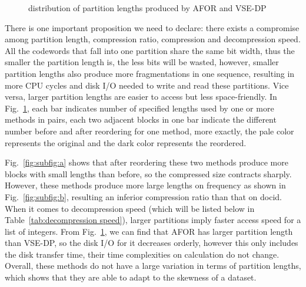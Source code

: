 \documentclass[runningheads,a4paper]{llncs}
\begin{document}
\begin{figure}
	\centering
	\caption[distribution of partition lengths 1]{distribution of partition lengths produced by AFOR and VSE-DP}
	\label{fig:bcHistogram}
\end{figure}

There is one important proposition we need to declare: there exists a compromise among partition length, compression ratio, compression and decompression speed. All the codewords that fall into one partition share the same bit width, thus the smaller the partition length is, the less bits will be wasted, however, smaller partition lengths also produce more fragmentations in one sequence, resulting in more CPU cycles and disk I/O needed to write and read these partitions. Vice versa, larger partition lengths are easier to access but less space-friendly. In Fig.~\ref{fig:bcHistogram}, each bar indicates number of specified lengths used by one or more methods in pairs, each two adjacent blocks in one bar indicate the different number before and after reordering for one method, more exactly, the pale color represents the original and the dark color represents the reordered.

Fig.~\ref{fig:subfig:a} shows that after reordering these two methods produce more blocks with small lengths than before, so the compressed size contracts sharply. However, these methods produce more large lengths on frequency as shown in Fig.~\ref{fig:subfig:b}, resulting an inferior compression ratio than that on docid. When it comes to decompression speed (which will be listed below in Table~\ref{tab:decompression speed}), larger partitions imply faster access speed for a list of integers. From Fig.~\ref{fig:bcHistogram}, we can find that AFOR has larger partition length than VSE-DP, so the disk I/O for it decreases orderly, however this only includes the disk transfer time, their time complexities on calculation do not change. Overall, these methods do not have a large variation in terms of partition lengths, which shows that they are able to adapt to the skewness of a dataset.
\end{document}
